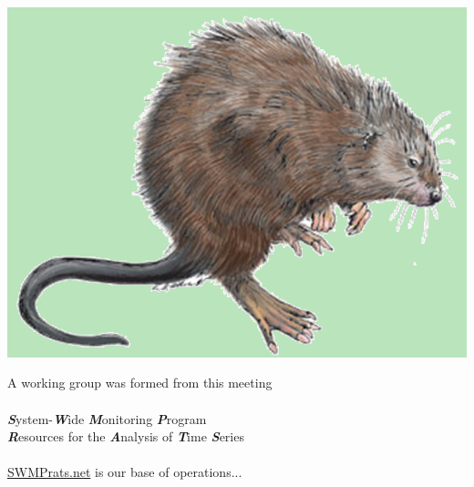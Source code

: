\documentclass[serif]{beamer}\usepackage[]{graphicx}\usepackage[]{color}
\newcommand{\Bigtxt}[1]{\textbf{\textit{#1}}}
\begin{document}
\begin{frame}{\includegraphics[width=0.05\paperwidth]{fig/muskrat.png}\hspace{0.07in}{\bf Genesis of SWMPrats}}
\centerline{}
\vspace{0.2in}
A working group was formed from this meeting \\~\\
\Large
\Bigtxt{S}ystem-\Bigtxt{W}ide \Bigtxt{M}onitoring \Bigtxt{P}rogram \\
\hspace{0.5in} \Bigtxt{R}esources for the \Bigtxt{A}nalysis of \Bigtxt{T}ime \Bigtxt{S}eries \\~\\
\normalsize
\href{http://swmprats.net}{SWMPrats.net} is our base of operations...
\end{frame}
\end{document}
